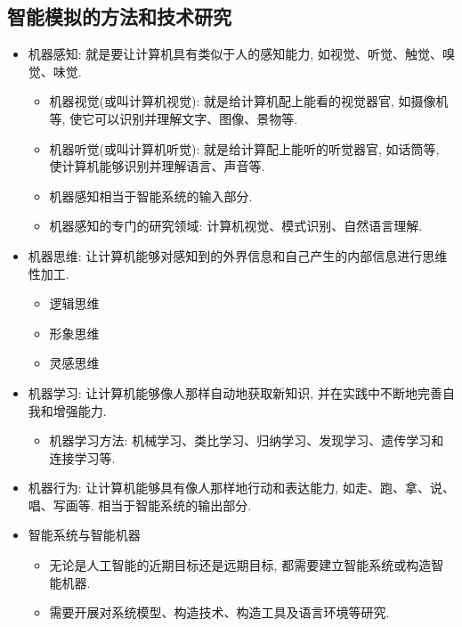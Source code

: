 \subsection{智能模拟的方法和技术研究}
\begin{itemize}
\item 机器感知: 就是要让计算机具有类似于人的感知能力, 如视觉、听觉、触觉、嗅觉、味觉.
      \begin{itemize}
         \item 机器视觉(或叫计算机视觉): 就是给计算机配上能看的视觉器官, 如摄像机等, 使它可以识别并理解文字、图像、景物等.
         \item 机器听觉(或叫计算机听觉): 就是给计算配上能听的听觉器官, 如话筒等, 使计算机能够识别并理解语言、声音等.
         \item 机器感知相当于智能系统的输入部分.
         \item 机器感知的专门的研究领域: 计算机视觉、模式识别、自然语言理解.
      \end{itemize}
\item 机器思维: 让计算机能够对感知到的外界信息和自己产生的内部信息进行思维性加工.
      \begin{itemize}
         \item 逻辑思维
         \item 形象思维
         \item 灵感思维
      \end{itemize}
\item 机器学习: 让计算机能够像人那样自动地获取新知识, 并在实践中不断地完善自我和增强能力.
      \begin{itemize}
         \item 机器学习方法: 机械学习、类比学习、归纳学习、发现学习、遗传学习和连接学习等.
      \end{itemize}
\item 机器行为: 让计算机能够具有像人那样地行动和表达能力, 如走、跑、拿、说、唱、写画等.  相当于智能系统的输出部分.
\item 智能系统与智能机器
      \begin{itemize}
         \item 无论是人工智能的近期目标还是远期目标, 都需要建立智能系统或构造智能机器.
         \item 需要开展对系统模型、构造技术、构造工具及语言环境等研究.
      \end{itemize}
\end{itemize}
